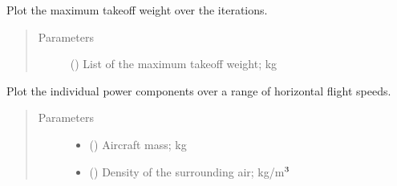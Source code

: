 \documentclass[letterpaper,10pt,english]{sphinxmanual}
\begin{document}
\begin{fulllineitems}
\begin{fulllineitems}
\label{\detokenize{modules/helicopter:helicopter.Helicopter.plot_mtow_convergence}}
\sphinxAtStartPar
Plot the maximum take\sphinxhyphen{}off weight over the iterations.
\begin{quote}\begin{description}
\item[{Parameters}] \leavevmode
\sphinxAtStartPar
{} (\sphinxstyleliteralemphasis{\sphinxupquote{{[}}}\sphinxstyleliteralemphasis{\sphinxupquote{{]}}}) \textendash{} List of the maximum take\sphinxhyphen{}off weight; kg

\end{description}\end{quote}

\end{fulllineitems}


\begin{fulllineitems}
\label{\detokenize{modules/helicopter:helicopter.Helicopter.plot_power_curves}}
\sphinxAtStartPar
Plot the individual power components over a range of horizontal flight
speeds.
\begin{quote}\begin{description}
\item[{Parameters}] \leavevmode\begin{itemize}
\item {} 
\sphinxAtStartPar
{} () \textendash{} Aircraft mass; kg

\item {} 
\sphinxAtStartPar
{} () \textendash{} Density of the surrounding air; kg/m\(\sp{\text{3}}\)


\end{itemize}
\end{description}
\end{quote}
\end{fulllineitems}
\end{fulllineitems}
\end{document}
